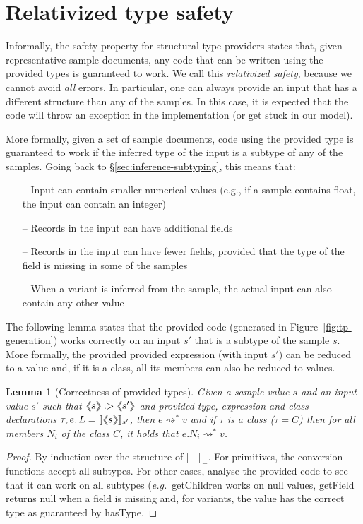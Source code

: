 \documentclass[10pt,preprint,blind,clearpagebib]{sigplanconf}
\newcommand{\langl}{\begin{picture}(4.5,7)
\put(1.1,2.5){\rotatebox{60}{\line(1,0){5.5}}}
\put(1.1,2.5){\rotatebox{300}{\line(1,0){5.5}}}
\end{picture}}
\newcommand{\rangl}{\begin{picture}(4.5,7)
\put(.9,2.5){\rotatebox{120}{\line(1,0){5.5}}}
\put(.9,2.5){\rotatebox{240}{\line(1,0){5.5}}}
\end{picture}}
\newcommand{\llangl}{\langl\hspace{-0.35em}\langl}
\newcommand{\rrangl}{\rangl\hspace{-0.35em}\rangl}
\newcommand{\kvd}[1]{\textnormal{\textcolor{kvdclr}{\sffamily #1}}}
\newcommand{\ident}[1]{\textnormal{\sffamily #1}}
\newcommand{\reduce}{\rightsquigarrow}
\newcommand{\sem}[1]{\llbracket #1 \rrbracket}
\newcommand{\semalt}[1]{\llangl #1 \rrangl}
\newtheorem{lemma}[theorem]{Lemma}
\begin{document}
\section{Relativized type safety}
\label{sec:safety}

Informally, the safety property for structural type providers states that, given representative sample
documents, any code that can be written using the provided types is guaranteed to work. We call this 
\emph{relativized safety}, because we cannot avoid \emph{all} errors. In particular, one can always
provide an input that has a different structure than any of the samples. In this case, it is expected 
that the code will throw an exception in the implementation (or get stuck in our model).

More formally, given a set of sample documents, code using the provided type is guaranteed to work if 
the inferred type of the input is a subtype of any of the samples. Going back to 
\S\ref{sec:inference-subtyping}, this means that:
%
\begin{itemize}[noitemsep]
\item[--] Input can contain smaller numerical values (e.g., if a sample contains float, the input can contain an integer)
\item[--] Records in the input can have additional fields
\item[--] Records in the input can have fewer fields, provided that the type of the field is missing in some of the samples
\item[--] When a variant is inferred from the sample, the actual input can also contain any other value  
\end{itemize}
%
The following lemma states that the provided code (generated in Figure~\ref{fig:tp-generation})
works correctly on an input $s'$ that is a subtype of the sample $s$. More formally, the provided
provided expression (with input $s'$) can be reduced to a value and, if it is a class,
all its members can also be reduced to values.

\begin{lemma}[Correctness of provided types]
\label{thm:tp-correctness}
Given a sample value $s$ and an input value $s'$ such that $\semalt{s} :> \semalt{s'}$
and provided type, expression and class declarations $\tau, e, L = \sem{\semalt{s}}_{s'}$, 
then $e \reduce^{*} v$ and if $\tau$ is a class ($\tau=C$) then for all members $N_i$ of the 
class $C$, it holds that $e.N_i \reduce^{*} v$.
\end{lemma}
\begin{proof}
By induction over the structure of $\sem{-}_-$. For primitives, the conversion functions accept all subtypes.
For other cases, analyse the provided code to see that it can work on all subtypes (\emph{e.g.}~\ident{getChildren}
works on \kvd{null} values, \ident{getField} returns \kvd{null} when a field is missing and, for variants,
the value has the correct type as guaranteed by \ident{hasType}.
\end{proof}
\end{document}
